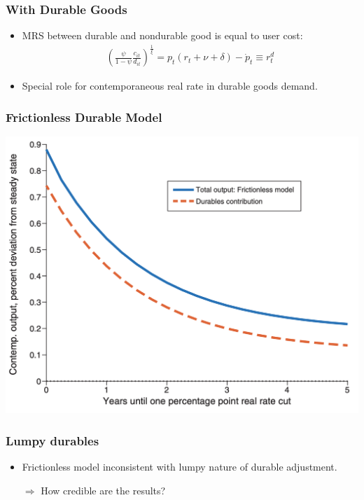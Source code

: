 \documentclass[english,xcolor=svgnames]{beamer}
\begin{document}
\begin{frame}
    \frametitle{With Durable Goods}
    \begin{itemize}
    	\item MRS between durable and nondurable good is equal to user cost:
    	\begin{align*}
    		\left(\frac{\psi}{1-\psi}\frac{c_{it}}{d_{it}}\right)^{\frac{1}{\xi}} = p_t(r_t + \nu +\delta) - \dot{p}_t \equiv r_t^d
    	\end{align*}
    	\item Special role for contemporaneous real rate in durable goods demand.
    \end{itemize}
\end{frame}

\begin{frame}
    \frametitle{Frictionless Durable Model}
    \begin{center}
    	\includegraphics[scale=0.3]{figures/MWFGFIG1.png}	
    \end{center}
\end{frame}


\begin{frame}
    \frametitle{Lumpy durables}
    \begin{itemize}
    	\item Frictionless model inconsistent with lumpy nature of durable adjustment. 
    	\item[$\Rightarrow$] How credible are the results?
    \end{itemize}
\end{frame}
\end{document}

